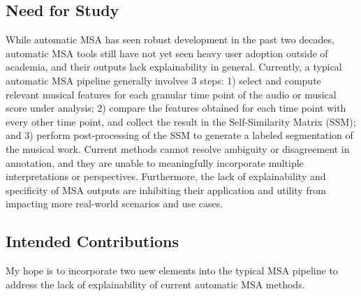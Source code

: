 
\subsection{Need for Study}
While automatic MSA has seen robust development in the past two decades, automatic MSA tools still have not yet seen heavy user adoption outside of academia, and their outputs lack explainability in general. 
Currently, a typical automatic MSA pipeline generally involves 3 steps: 1) select and compute relevant musical features for each granular time point of the audio or musical score under analysis; 2) compare the features obtained for each time point with every other time point, and collect the result in the Self-Similarity Matrix (SSM); and 3) perform post-processing of the SSM to generate a labeled segmentation of the musical work. 
Current methods cannot resolve ambiguity or disagreement in annotation, and they are unable to meaningfully incorporate multiple interpretations or perspectives. 
Furthermore, the lack of explainability and specificity of MSA outputs are inhibiting their application and utility from impacting more real-world scenarios and use cases.

\subsection{Intended Contributions}

My hope is to incorporate two new elements into the typical MSA pipeline to address the lack of explainability of current automatic MSA methods.

